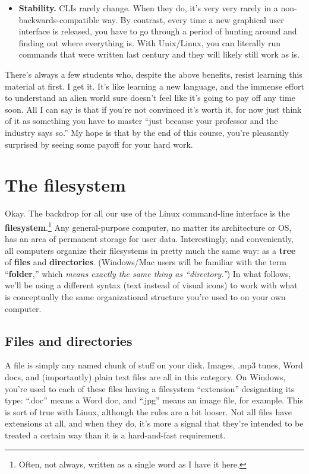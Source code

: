 \begin{itemize}
\item \textbf{Stability.} CLIs rarely change. When they do, it's very very
rarely in a non-backwards-compatible way. By contrast, every time a new
graphical user interface is released, you have to go through a period of
hunting around and finding out where everything is. With Unix/Linux, you can
literally run commands that were written last century and they will likely
still work as is.

\end{itemize}

There's always a few students who, despite the above benefits, resist learning
this material at first. I get it. It's like learning a new language, and the
immense effort to understand an alien world sure doesn't feel like it's going
to pay off any time soon. All I can say is that if you're not convinced it's
worth it, for now just think of it as something you have to master ``just
because your professor and the industry says so.'' My hope is that by the end
of this course, you're pleasantly surprised by seeing some payoff for your
hard work.


\section{The filesystem}

Okay. The backdrop for all our use of the Linux command-line interface is the
\textbf{filesystem}.\footnote{Often, not always, written as a single word as I
have it here.} Any general-purpose computer, no matter its architecture or OS,
has an area of permanent storage for user data. Interestingly, and
conveniently, all computers organize their filesystems in pretty much the same
way: as a \textbf{tree} of \textbf{files} and \textbf{directories}.
(Windows/Mac users will be familiar with the term ``\textbf{folder},'' which
\textit{means exactly the same thing as ``directory.''}) In what follows, we'll
be using a different syntax (text instead of visual icons) to work with what is
conceptually the same organizational structure you're used to on your own
computer.

\subsection{Files and directories}

A file is simply any named chunk of stuff on your disk. Images, .mp3 tunes,
Word docs, and (importantly) plain text files are all in this category. On
Windows, you're used to each of these files having a filesystem ``extension''
designating its type: ``.doc'' means a Word doc, and ``.jpg'' means an image
file, for example. This is sort of true with Linux, although the rules are
a bit looser. Not all files have extensions at all, and when they do, it's
more a signal that they're intended to be treated a certain way than it is a
hard-and-fast requirement.

